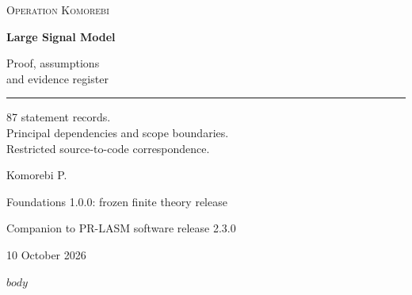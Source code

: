 \documentclass[11pt,letterpaper]{article}
\begin{document}
\hypersetup{pageanchor=false}
\begin{titlepage}
\vspace*{0.5in}
{\small\textsc{Operation Komorebi}\par}
\vspace{0.72in}
{\fontsize{33}{39}\selectfont\bfseries Large Signal Model\par}
\vspace{0.3in}
{\fontsize{21}{27}\selectfont Proof, assumptions\\and evidence register\par}
\vspace{0.45in}
\rule{\textwidth}{0.45pt}\par
\vspace{0.3in}
\begin{minipage}{0.95\textwidth}
\large
87 statement records.\\Principal dependencies and scope boundaries.\\Restricted source-to-code correspondence.
\end{minipage}
\vfill
{\Large Komorebi P.\par}
\vspace{0.2in}
{\normalsize Foundations 1.0.0: frozen finite theory release\par}
{\normalsize Companion to PR-LASM software release 2.3.0\par}
{\normalsize 10 October 2026\par}
\end{titlepage}
\hypersetup{pageanchor=true}
$body$
\end{document}
